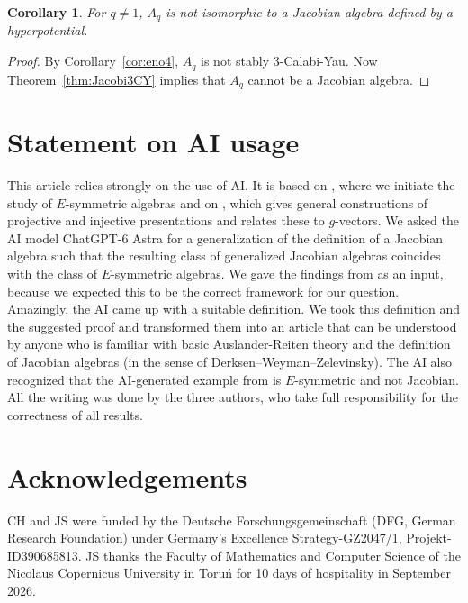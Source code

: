 \documentclass[12pt,reqno]{amsart}
\newtheorem{Cor}[Thm]{Corollary}
\theoremstyle{definition}
\begin{document}
\begin{Cor}\label{cor:exnonjacobian}
For $q \not= 1$, $A_q$ is not isomorphic to a Jacobian algebra 
defined by a hyperpotential.
\end{Cor}

\begin{proof}
By Corollary~\ref{cor:eno4}, $A_q$ is not stably $3$-Calabi-Yau.
Now Theorem~\ref{thm:Jacobi3CY} implies that
$A_q$ cannot be a Jacobian algebra.
\end{proof}


\bigskip



\section*{Statement on AI usage}
This article relies strongly on the use of AI. 
It is based on \cite{BS26}, where we initiate the study of $E$-symmetric algebras and on \cite{GHLS26}, which gives 
general constructions of projective and injective presentations and relates these to $g$-vectors.
We asked the AI model ChatGPT-6 Astra for a generalization of the definition of a Jacobian algebra such that the resulting class of generalized Jacobian algebras coincides with the class of $E$-symmetric algebras.
We gave the findings from \cite{GHLS26} as an input, because we 
expected this to be the correct framework for our question. 
Amazingly, the AI came up with a suitable definition.
We took this definition and the suggested proof and transformed them
into an article
that can be understood by anyone who is familiar with basic Auslander-Reiten theory and the definition of Jacobian algebras (in the sense of Derksen--Weyman--Zelevinsky).
The AI also recognized that the AI-generated example from \cite{E26} is $E$-symmetric and not Jacobian.
All the writing was done by the three authors, who take full responsibility for the correctness of all results.


\section*{Acknowledgements}
CH and JS were funded by the Deutsche Forschungsgemeinschaft (DFG, German Research
Foundation) under Germany’s Excellence Strategy-GZ2047/1, Projekt-ID390685813.
JS thanks the
Faculty of Mathematics and Computer Science
of the Nicolaus Copernicus University in Toru\'n for 10 days of hospitality in September 2026.
\end{document}
